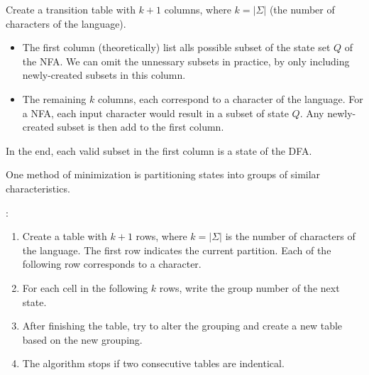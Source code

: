   \par Create a transition table with $k + 1$ columns, where $k = |\Sigma|$ (the number of characters of the language).
    \begin{itemize}
      \item The first column (theoretically) list alls possible subset of the state set $Q$ of the NFA. We can omit the unnessary subsets in practice, by only including newly-created subsets in this column.
      \item The remaining $k$ columns, each correspond to a character of the language. For a NFA, each input character would result in a subset of state $Q$. Any newly-created subset is then add to the first column.
    \end{itemize}
  \par In the end, each valid subset in the first column is a state of the DFA.

  \par One method of minimization is partitioning states into groups of similar characteristics.
  \par {}:
  \begin{enumerate}
    \item Create a table with $k + 1$ rows, where $k = |\Sigma|$ is the number of characters of the language. The first row indicates the current partition. Each of the following row corresponds to a character.
    \item For each cell in the following $k$ rows, write the group number of the next state.
    \item After finishing the table, try to alter the grouping and create a new table based on the new grouping.
    \item The algorithm stops if two consecutive tables are indentical.
  \end{enumerate}